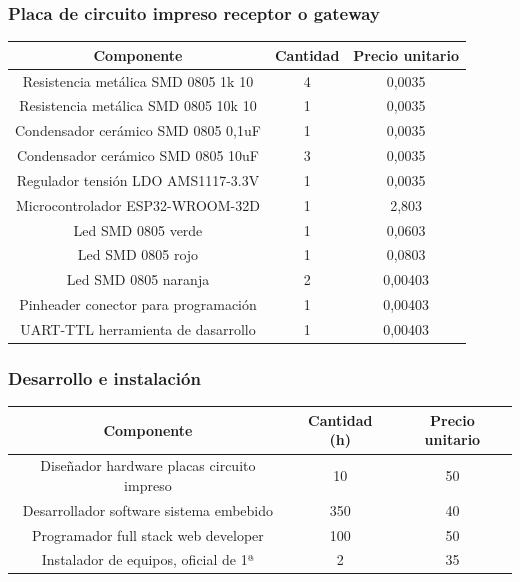 \documentclass[a4paper ,12pt, onecolumn]{article}
\begin{document}
                \subsubsection{Placa de circuito impreso receptor o gateway}
                \begin{center}
                    \begin{tabular}{||c | c |c ||} 
                    \hline
                    Componente & Cantidad & Precio unitario  \\ [0.5ex] 
                    \hline\hline
                    Resistencia metálica SMD 0805 1k 10 & 4 & 0,0035 \\ 
                    Resistencia metálica SMD 0805 10k 10  & 1 & 0,0035 \\ 
                    Condensador cerámico SMD 0805 0,1uF  & 1 & 0,0035 \\ 
                    Condensador cerámico SMD 0805 10uF  & 3 & 0,0035 \\ 
                    Regulador tensión LDO AMS1117-3.3V  & 1 & 0,0035 \\ 
                    Microcontrolador ESP32-WROOM-32D   & 1 & 2,803 \\ 
                    Led SMD 0805 verde& 1 & 0,0603 \\ 
                    Led SMD 0805 rojo& 1 & 0,0803 \\ 
                    Led SMD 0805 naranja & 2 & 0,00403 \\ 
                    Pinheader conector para programación & 1 & 0,00403 \\ 
                    UART-TTL herramienta de dasarrollo & 1 & 0,00403 \\ 
                    \hline
                    \end{tabular}
                \end{center}
            \subsubsection{Desarrollo e instalación}
            \begin{center}
                \begin{tabular}{||c | c |c ||} 
                \hline
                Componente & Cantidad (h) & Precio unitario  \\ [0.5ex] 
                \hline\hline
                Diseñador hardware placas circuito impreso & 10 & 50 \\ 
                Desarrollador  software sistema embebido & 350 & 40 \\ 
                Programador full stack web developer & 100 & 50 \\ 
                Instalador de equipos, oficial de 1ª & 2 & 35 \\ 
                \hline
                \end{tabular}
            \end{center}
\end{document}
